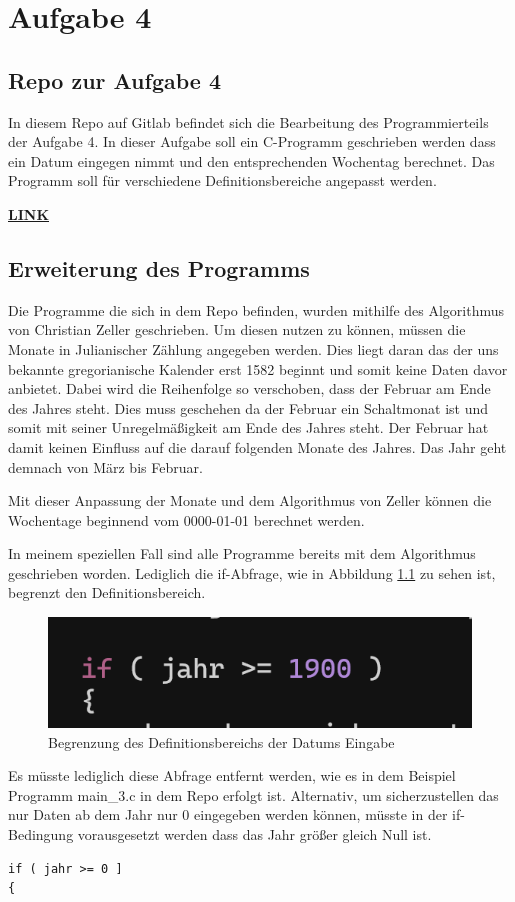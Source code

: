 \chapter{Aufgabe 4}
\section{Repo zur Aufgabe 4}
In diesem Repo auf Gitlab befindet sich die Bearbeitung des Programmierteils der Aufgabe 4. 
In dieser Aufgabe soll ein C-Programm geschrieben werden dass ein Datum eingegen nimmt und den entsprechenden Wochentag berechnet.
Das Programm soll für verschiedene Definitionsbereiche angepasst werden. \par
\href{https://gitlab.thga.de/daniel.krueger/pruefung_sose_2023_aufgabe_4_getopt}{\textbf{LINK}}

\section{Erweiterung des Programms}
Die Programme die sich in dem Repo befinden, wurden mithilfe des Algorithmus von Christian Zeller \cite{Zeller:2022}geschrieben.
Um diesen nutzen zu können, müssen die Monate in Julianischer Zählung angegeben werden.
Dies liegt daran das der uns bekannte gregorianische Kalender erst 1582 beginnt und somit keine Daten davor anbietet.
Dabei wird die Reihenfolge so verschoben, dass der Februar am Ende des Jahres steht.
Dies muss geschehen da der Februar ein Schaltmonat ist und somit mit seiner Unregelmäßigkeit am Ende des Jahres steht.
Der Februar hat damit keinen Einfluss auf die darauf folgenden Monate des Jahres.
Das Jahr geht demnach von März bis Februar.\par
Mit dieser Anpassung der Monate und dem Algorithmus von Zeller können die Wochentage beginnend vom 0000-01-01 berechnet werden.\par
In meinem speziellen Fall sind alle Programme bereits mit dem Algorithmus geschrieben worden.
Lediglich die if-Abfrage, wie in Abbildung \ref{definitionsbereich} zu sehen ist, begrenzt den Definitionsbereich.

\begin{figure}[h]
	\centering
	\includegraphics[scale=0.7]{Images/Definitionsbereich_4.png}
	\caption{Begrenzung des Definitionsbereichs der Datums Eingabe}
	\label{definitionsbereich}
\end{figure}

Es müsste lediglich diese Abfrage entfernt werden, wie es in dem Beispiel Programm main\_3.c in dem Repo erfolgt ist. 
Alternativ, um sicherzustellen das nur Daten ab dem Jahr nur 0 eingegeben werden können, müsste in der if-Bedingung vorausgesetzt werden dass das Jahr größer gleich Null ist.
\begin{lstlisting}
if ( jahr >= 0 ]
{
\end{lstlisting}
